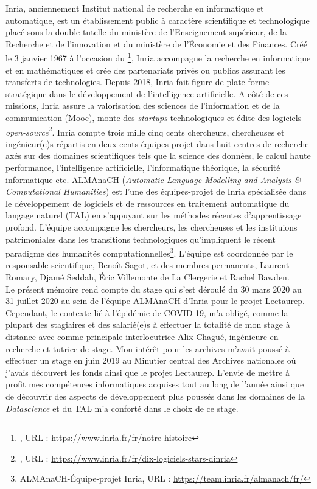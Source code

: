 Inria, anciennement Institut national de recherche en informatique et automatique, est un établissement public à caractère scientifique et technologique placé sous la double tutelle du ministère de l'Enseignement supérieur, de la Recherche et de l'innovation et du ministère de l'Économie et des Finances. Créé le 3 janvier 1967 à l'occasion du \footnote{, URL : \url{https://www.inria.fr/fr/notre-histoire}}, Inria accompagne la recherche en informatique et en mathématiques et crée des partenariats privés ou publics assurant les transferts de technologies. Depuis 2018, Inria fait figure de plate-forme stratégique dans le développement de l'intelligence artificielle. A côté de ces missions, Inria assure la valorisation des sciences de l'information et de la communication (Mooc), monte des \textit{startups} technologiques et édite des logiciels \textit{open-source}\footnote{, URL : \url{https://www.inria.fr/fr/dix-logiciels-stars-dinria}}. Inria compte trois mille cinq cents chercheurs, chercheuses et ingénieur(e)s répartis en deux cents équipes-projet dans huit centres de recherche axés sur des domaines scientifiques tels que la science des données, le calcul haute performance, l'intelligence artificielle, l'informatique théorique, la sécurité informatique etc.  ALMAnaCH (\textit{Automatic Language Modelling and Analysis \& Computational Humanities}) est l'une des équipes-projet de Inria spécialisée dans le développement de logiciels et de ressources en traitement automatique du langage naturel (TAL) en s'appuyant sur les méthodes récentes d'apprentissage profond. L'équipe accompagne les chercheurs, les chercheuses et les instituions patrimoniales dans les transitions technologiques qu'impliquent le récent paradigme des humanités computationnelles\footnote{ALMAnaCH-Équipe-projet Inria, URL : \url{https://team.inria.fr/almanach/fr/}}. L'équipe est coordonnée par le responsable scientifique, Benoît Sagot, et des membres permanents, Laurent Romary, Djamé Seddah, Éric Villemonte de La Clergerie et Rachel Bawden.\\

Le présent mémoire rend compte du stage qui s'est déroulé du 30 mars 2020 au 31 juillet 2020 au sein de l'équipe ALMAnaCH d'Inria pour le projet Lectaurep. Cependant, le contexte lié à l'épidémie de COVID-19, m'a obligé, comme la plupart des stagiaires et des salarié(e)s à effectuer la totalité de mon stage à distance avec comme principale interlocutrice Alix Chagué, ingénieure en recherche et tutrice de stage. Mon intérêt pour les archives m'avait poussé à effectuer un stage en juin 2019 au Minutier central des Archives nationales où j'avais découvert les fonds ainsi que le projet Lectaurep. L'envie de mettre à profit mes compétences informatiques acquises tout au long de l'année ainsi que de découvrir des aspects de développement plus poussés dans les domaines de la \textit{Datascience} et du TAL m'a conforté dans le choix de ce stage.\\

